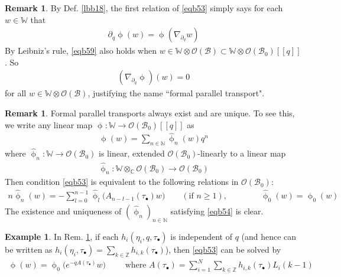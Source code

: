 \documentclass[11pt,b5paper,notitlepage]{article}
\theoremstyle{definition}
\newtheorem{eg}[df]{Example}
\newtheorem{rem}[df]{Remark}
\theoremstyle{plain}
\newcommand{\mc}{\mathcal}
\newcommand{\wht}{\widehat}
\newcommand{\blt}{\bullet}
\newcommand{\Wbb}{\mathbb W}
\newcommand{\Cbb}{\mathbb C}
\newcommand{\Nbb}{\mathbb N}
\newcommand{\Zbb}{\mathbb Z}
\newcommand{\<}{\left\langle}
\renewcommand{\>}{\right\rangle}
\newcommand{\MB}{\mathcal{B}}
\numberwithin{equation}{section}
\begin{document}
\begin{rem}\label{lbb24}
By Def. \ref{lbb18}, the first relation of \eqref{eqb53} simply says for each $w\in\Wbb$ that 
\begin{align}\label{eqb59}
\partial_q\upphi(w)=\upphi(\nabla_{\partial_q}w)
\end{align}
By Leibniz's rule, \eqref{eqb59} also holds when $w\in \Wbb\otimes\mc O(\MB)\subset\Wbb\otimes\mc O(\MB_0)[[q]]$. So
\begin{align*}
(\nabla_{\partial_q}\upphi)(w)=0
\end{align*}
for all $w\in \Wbb\otimes\mc O(\MB)$, justifying the name ``formal parallel transport".
\end{rem}


\begin{rem}\label{lbb23}
Formal parallel transports always exist and are unique. To see this, we write any linear map $\upphi:\Wbb\rightarrow\mc O(\MB_0)[[q]]$ as
\begin{align*}
\upphi(w)=\sum_{n\in\Nbb}\wht\upphi_n(w)q^n
\end{align*}
where $\wht\upphi_n:\Wbb\rightarrow\mc O(\MB_0)$ is linear, extended $\mc O(\MB_0)$-linearly to a linear map
\begin{align*}
\wht\upphi_n:\Wbb\otimes_\Cbb\mc O(\MB_0)\rightarrow\mc O(\MB_0)
\end{align*}
Then condition \eqref{eqb53} is equivalent to the following relations in $\mc O(\MB_0)$:
\begin{align}\label{eqb54}
 n\wht\upphi_n(w) =-\sum_{l=0}^{n-1} \wht\upphi_l\big( A_{n-l-1}(\tau_\blt)w\big)\qquad(\text{if }n\geq 1),\qquad\qquad \wht\upphi_0(w)=\upphi_0(w)
\end{align}
The existence and uniqueness of $(\wht\upphi_n)_{n\in\Nbb}$ satisfying \eqref{eqb54} is clear. 
\end{rem}



\begin{eg}\label{lbb32}
In Rem. \ref{lbb23}, if each $h_i(\eta_i,q,\tau_\blt)$ is independent of $q$ (and hence can be written as $h_i(\eta_i,\tau_\blt)=\sum_{k\in\Zbb}h_{i,k}(\tau_\blt)$), then \eqref{eqb53} can be solved by
\begin{align}\label{eqb64}
\upphi(w)=\upphi_0\big(e^{-qA(\tau_\blt)}w\big)\qquad\text{ where } A(\tau_\blt)=\sum_{i=1}^N \sum_{k\in\Zbb}h_{i,k}(\tau_\blt)L_i(k-1)
\end{align} 
\end{eg}
\end{document}
